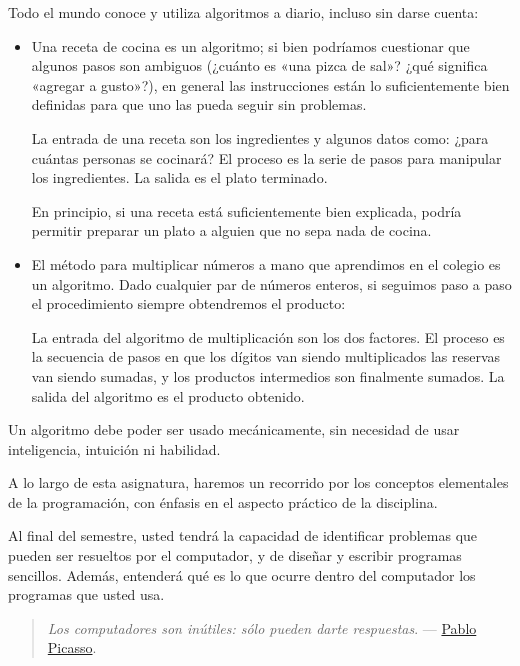 Todo el mundo conoce y utiliza algoritmos a diario, incluso sin darse
cuenta:

\begin{itemize}
\item
  Una receta de cocina es un algoritmo; si bien podríamos cuestionar que
  algunos pasos son ambiguos (¿cuánto es «una pizca de sal»? ¿qué
  significa «agregar a gusto»?), en general las instrucciones están lo
  suficientemente bien definidas para que uno las pueda seguir sin
  problemas.

  La entrada de una receta son los ingredientes y algunos datos como:
  ¿para cuántas personas se cocinará? El proceso es la serie de pasos
  para manipular los ingredientes. La salida es el plato terminado.

  En principio, si una receta está suficientemente bien explicada,
  podría permitir preparar un plato a alguien que no sepa nada de
  cocina.
\end{itemize}

\begin{itemize}
\item
  El 
      método para multiplicar
  números a mano que aprendimos en el colegio es un
  algoritmo. Dado cualquier par de números enteros, si seguimos paso a
  paso el procedimiento siempre obtendremos el producto:


  La entrada del algoritmo de multiplicación son los dos factores. El
  proceso es la secuencia de pasos en que los dígitos van siendo
  multiplicados las reservas van siendo sumadas, y los productos
  intermedios son finalmente sumados. La salida del algoritmo es el
  producto obtenido.
\end{itemize}

Un algoritmo debe poder ser usado mecánicamente, sin necesidad de usar
inteligencia, intuición ni habilidad.

A lo largo de esta asignatura, haremos un recorrido por los conceptos
elementales de la programación, con énfasis en el aspecto práctico de la
disciplina.

Al final del semestre, usted tendrá la capacidad de identificar
problemas que pueden ser resueltos por el computador, y de diseñar y
escribir programas sencillos. Además, entenderá qué es lo que ocurre
dentro del computador los programas que usted usa.

\begin{quote}
\emph{Los computadores son inútiles: sólo pueden darte respuestas}. ---
\href{http://es.wikipedia.org/wiki/Pablo_Picasso}{Pablo Picasso}.
\end{quote}

